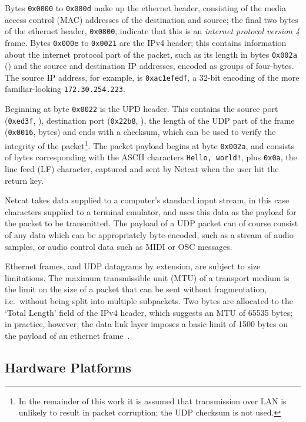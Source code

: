 Bytes \texttt{0x0000} to \texttt{0x000d} make up the ethernet header,
consisting of the media access control (MAC) addresses of the destination and
source; the final two bytes of the ethernet header, \texttt{0x0800}, indicate
that this is an \textit{internet protocol version 4} frame.
Bytes \texttt{0x000e} to \texttt{0x0021} are the IPv4 header; this contains
information about the internet protocol part of the packet, such as its length
in bytes \textemdash{} \texttt{0x002a} () \textemdash{} and
the source and destination IP addresses, encoded as groups of four-bytes.
The source IP address, for example, is \texttt{0xac1efedf}, a 32-bit encoding
of the more familiar-looking \texttt{172.30.254.223}.

Beginning at byte \texttt{0x0022} is the UPD header.
This contains the source port (\texttt{0xed3f}, ), destination
port (\texttt{0x22b8}, ), the length of the UDP part of the frame
(\texttt{0x0016},  bytes) and ends with a checksum, which
can be used to verify the integrity of the packet\footnote{
    In the remainder of this work it is assumed that transmission over LAN is
    unlikely to result in packet corruption; the UDP checksum is not used.
}.
The packet payload begins at byte \texttt{0x002a}, and consists of bytes
corresponding with the ASCII characters \texttt{Hello, world!}, plus
\texttt{0x0a}, the line feed (LF) character, captured and sent by Netcat when
the user hit the return key.

Netcat takes data supplied to a computer's standard input stream, in this
case characters supplied to a terminal emulator, and uses this data as the
payload for the packet to be transmitted.
The payload of a UDP packet can of course consist of any data which can be
appropriately byte-encoded, such as a stream of audio samples, or audio control
data such as MIDI or OSC messages.

Ethernet frames, and UDP datagrams by extension, are subject to size
limitations.
The maximum transmissible unit (MTU) of a transport medium is the limit on the
size of a packet that can be sent without fragmentation, i.e.\ without being
split into multiple subpackets.
Two bytes are allocated to the `Total Length' field of the IPv4 header, which
suggests an MTU of \num{65535} bytes; in practice, however, the data link layer
imposes a basic limit of \num{1500} bytes on the payload of an ethernet
frame~\citep{schiavoni_alternatives_2013,noauthor_ieee_2018}.

\subsection{Hardware Platforms}\label{subsec:hardware-platforms}

